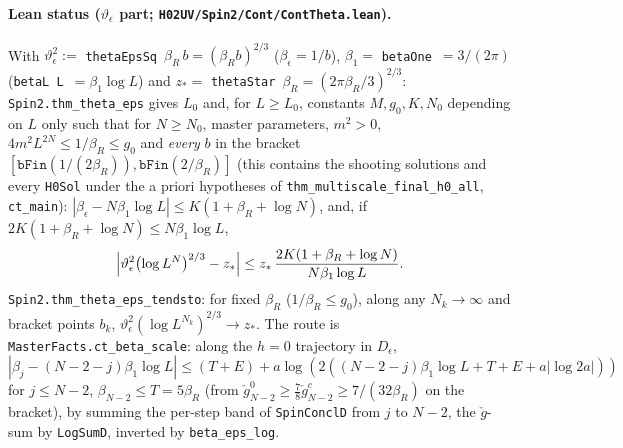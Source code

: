 \documentclass[11pt]{amsart}
\theoremstyle{definition}
\theoremstyle{remark}
\numberwithin{equation}{section}
\begin{document}
\paragraph{Lean status ($\vartheta_\epsilon$ part; \texttt{H02UV/Spin2/Cont/ContTheta.lean}).}
With $\vartheta_\epsilon^2:=$ \texttt{thetaEpsSq}~$\beta_R\,b=(\beta_Rb)^{2/3}$ ($\beta_\epsilon=1/b$),
$\beta_1=$ \texttt{betaOne}~$=3/(2\pi)$ (\texttt{betaL L}~$=\beta_1\log L$) and
$z_*=$ \texttt{thetaStar}~$\beta_R=(2\pi\beta_R/3)^{2/3}$:
\texttt{Spin2.thm\_theta\_eps} gives $L_0$ and, for $L\ge L_0$, constants $M,g_0,K,N_0$ depending on $L$
only such that for $N\ge N_0$, master parameters, $m^2>0$, $4m^2L^{2N}\le1/\beta_R\le g_0$ and
\emph{every} $b$ in the bracket $[\texttt{bFin}(1/(2\beta_R)),\texttt{bFin}(2/\beta_R)]$ (this contains
the shooting solutions and every \texttt{H0Sol} under the a priori hypotheses of
\texttt{thm\_multiscale\_final\_h0\_all}, \texttt{ct\_main}):
$|\beta_\epsilon-N\beta_1\log L|\le K(1+\beta_R+\log N)$, and, if $2K(1+\beta_R+\log N)\le N\beta_1\log L$,
\[
\Bigl|\vartheta_\epsilon^2\bigl(\log L^N\bigr)^{2/3}-z_*\Bigr|\le z_*\,\frac{2K(1+\beta_R+\log N)}{N\beta_1\log L}.
\]
\texttt{Spin2.thm\_theta\_eps\_tendsto}: for fixed $\beta_R$ ($1/\beta_R\le g_0$), along any
$N_k\to\infty$ and bracket points $b_k$, $\vartheta_\epsilon^2(\log L^{N_k})^{2/3}\to z_*$. The route is
\texttt{MasterFacts.ct\_beta\_scale}: along the $h=0$ trajectory in $D_\epsilon$,
$|\beta_j-(N-2-j)\beta_1\log L|\le(T+E)+a\log(2((N-2-j)\beta_1\log L+T+E+a|\log2a|))$ for $j\le N-2$,
$\beta_{N-2}\le T=5\beta_R$ (from $\check g^0_{N-2}\ge\frac78\check g^c_{N-2}\ge 7/(32\beta_R)$ on the bracket),
by summing the per-step band of \texttt{SpinConclD} from $j$ to $N-2$, the $\check g$-sum by
\texttt{LogSumD}, inverted by \texttt{beta\_eps\_log}.
\end{document}
